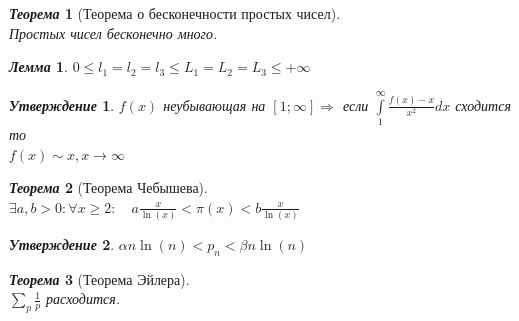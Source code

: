 \documentclass[a4paper,12pt]{article}
\newtheorem{teo2}{\textit{Теорема}}
\newtheorem{utv2}{\textit{Утверждение}}
\newtheorem{lem2}{\textit{Лемма}}
\newcommand{\q}{\quad}
\newcommand{\Ra}{\Rightarrow}
\newcommand{\IL}{\int\limits}
\begin{document}
\begin{formbox}{}
\begin{teo2}[Теорема о бесконечности простых чисел]\q\\
Простых чисел бесконечно много.
\end{teo2}
\end{formbox}
\begin{formbox}{}
\begin{lem2}
$0\le l_1 = l_2 = l_3 \le L_1 = L_2 = L_3 \le +\infty$
\end{lem2}
\end{formbox}
\begin{formbox}{}
\begin{utv2} $f(x)$ неубывающая на $[1;\infty]\Ra$ если $\IL_1^\infty \frac{f(x) - x}{x^2}dx$ сходится то \\$f(x)\sim x, x\to\infty$
\end{utv2}
\end{formbox}
\begin{formbox}{}
\begin{teo2}[Теорема Чебышева]\q\\
$\exists a,b > 0: \forall x \ge 2:\q a\frac{x}{\ln(x)} <\pi(x) <b\frac{x}{\ln(x)} $
\end{teo2}
\end{formbox}
\begin{formbox}{}
\begin{utv2} $\alpha n \ln(n) < p_n < \beta n \ln(n)   $
\end{utv2}
\end{formbox}

\begin{formbox}{}
\begin{teo2}[Теорема Эйлера]\q\\$\sum_p \frac{1}{p}$ расходится.
\end{teo2}
\end{formbox}
\end{document}
